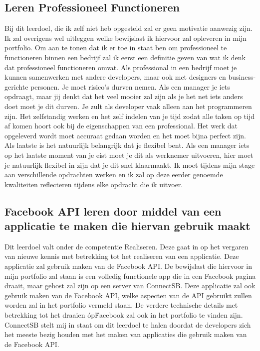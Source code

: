 \documentclass{article}
\begin{document}
\subsection{Leren Professioneel Functioneren}
Bij dit leerdoel, die ik zelf niet heb opgesteld zal er geen motivatie aanwezig zijn. Ik zal overigens wel uitleggen welke bewijslast ik hiervoor zal opleveren in mijn portfolio. 
Om aan te tonen dat ik er toe in staat ben om professioneel te functioneren binnen een bedrijf zal ik eerst een definitie geven van wat ik denk dat professioneel functioneren omvat. Als professional in een bedrijf moet je kunnen samenwerken met andere developers, maar ook met designers en business-gerichte personen. Je moet risico's durven nemen. Als een manager je iets opdraagt, maar jij denkt dat het veel mooier zal zijn als je het net iets anders doet moet je dit durven. Je zult als developer vaak alleen aan het programmeren zijn. Het zelfstandig werken en het zelf indelen van je tijd zodat alle taken op tijd af komen hoort ook bij de eigenschappen van een professional. Het werk dat opgeleverd wordt moet accuraat gedaan worden en het moet bijna perfect zijn. 
Als laatste is het natuurlijk belangrijk dat je flexibel bent. Als een manager iets op het laatste moment van je eist moet je dit als werknemer uitvoeren, hier moet je natuurlijk flexibel in zijn dat je dit snel klaarmaakt.
Ik moet tijdens mijn stage aan verschillende opdrachten werken en ik zal op deze eerder genoemde kwaliteiten reflecteren tijdens elke opdracht die ik uitvoer.

\subsection{Facebook API leren door middel van een applicatie te maken die hiervan gebruik maakt}
Dit leerdoel valt onder de competentie Realiseren. Deze gaat in op het vergaren van nieuwe kennis met betrekking tot het realiseren van een applicatie. Deze applicatie zal gebruik maken van de Facebook API. De bewijslast die hiervoor in mijn portfolio zal staan is een volledig functionele app die in een Facebook pagina draait, maar gehost zal zijn op een server van ConnectSB. Deze applicatie zal ook gebruik maken van de Facebook API, welke aspecten van de API gebruikt zullen worden zal in het portfolio vermeld staan. De verdere technische details met betrekking tot het draaien \'op\' Facebook zal ook in het portfolio te vinden zijn. ConnectSB stelt mij in staat om dit leerdoel te halen doordat de developers zich het meeste bezig houden met het maken van applicaties die gebruik maken van de Facebook API.
\end{document}
